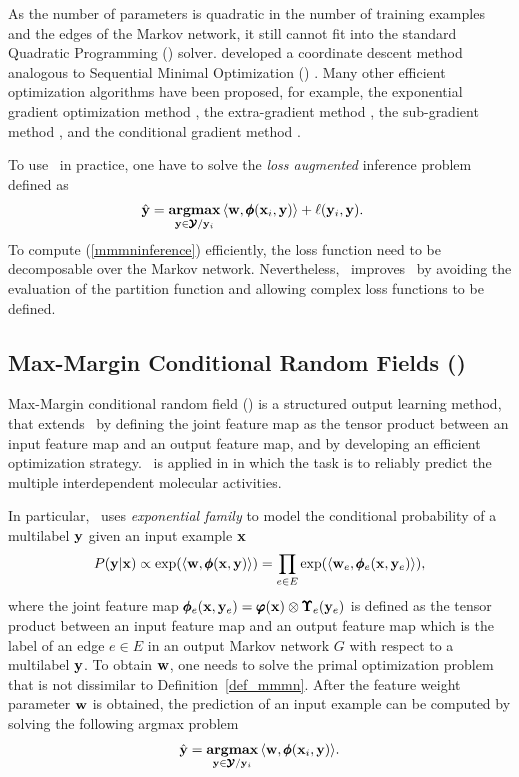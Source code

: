 {As the number of parameters is quadratic in the number of training examples and the edges of the Markov network, it still cannot fit into the standard Quadratic Programming (\qp) solver. 
\citet{Taskar04max} developed a coordinate descent method analogous to Sequential Minimal Optimization (\smo) \citep{Platt98sequential,Platt99fast}.
Many other efficient optimization algorithms have been proposed, for example, the exponential gradient optimization method \citep{bartlett04}, 
the extra-gradient method \citep{taskar06},
the sub-gradient method \citet{Ratliff07},
and the conditional gradient method \citep{Rousu06, Rousu07}.

To use \mmmn\ in practice, one have to solve the \textit{loss augmented} inference problem defined as
\begin{align}
	\hat{\mathbf {y}} = \underset{\mathbf {y}\in\pmb {\mathcal{Y}}/\mathbf {y}_i}{\textbf{argmax}} &\, \langle \mathbf {w}, \pmb \phi(\mathbf {x}_i,\mathbf {y}) \rangle + \mathbf {\ell}(\mathbf {y}_i,\mathbf {y}) \label{mmmninference}.
\end{align} 
To compute (\ref{mmmninference}) efficiently, the loss function need to be decomposable over the Markov network.
Nevertheless, \mmmn\ improves \crf\ by avoiding the evaluation of the partition function and allowing complex loss functions to be defined.



%
%
\subsection{Max-Margin Conditional Random Fields (\mmcrf)} \label{sc_mmcrf}

Max-Margin conditional random field (\mmcrf) \citep{Rousu07} is a structured output learning method, that extends \mmmn\ by defining the joint feature map as the tensor product between an input feature map and an output feature map, and by developing an efficient optimization strategy. 
\mmcrf\ is applied in  in which the task is to reliably predict the multiple interdependent molecular activities.

In particular, \mmcrf\ uses \textit{exponential family} to model the conditional probability of a multilabel $\mathbf {y}$ given an input example $\mathbf {x}$
\begin{align*}
	P(\mathbf {y}|\mathbf {x}) \propto \exp(\langle \mathbf {w}, \pmb \phi(\mathbf {x},\mathbf {y}) \rangle) = \prod_{e\in E}\exp(\langle \mathbf {w}_e, \pmb \phi_e(\mathbf {x},\mathbf {y}_e) \rangle),
\end{align*}
where the joint feature map $\pmb \phi_e(\mathbf {x},\mathbf {y}_e)=\pmb \varphi(\mathbf {x})\otimes\pmb \Upsilon_e(\mathbf {y}_e)$ is defined as the tensor product between an input feature map and an output feature map which is the label of an edge $e\in E$ in an output Markov network $G$ with respect to a multilabel $\mathbf {y}$. 
To obtain $\mathbf {w}$, one needs to solve the primal optimization problem that is not dissimilar to Definition~\ref{def_mmmn}.
After the feature weight parameter $\mathbf {w}$ is obtained, the prediction of an input example can be computed by solving the following argmax problem
\begin{align}
	\hat{\mathbf {y}} = \underset{\mathbf {y}\in\pmb {\mathcal{Y}}/\mathbf {y}_i}{\textbf{argmax}} \, \langle \mathbf {w}, \pmb \phi(\mathbf {x}_i,\mathbf {y}) \rangle.\label{mmcrfinference}
\end{align}

}
